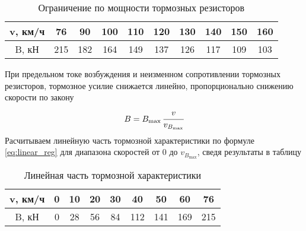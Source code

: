 \begin{table}[H]
 \centering
 \caption{Ограничение по мощности тормозных резисторов}
 \begin{tabular}{|c||c|c|c|c|c|c|c|c|c|}
  \hline
  v, км/ч & 76 & 90 & 100 & 110 & 120 & 130 & 140 & 150 & 160 \\ \hline
  B, кН & 215 & 182 & 164 & 149 & 137 & 126 & 117 & 109 & 103 \\ \hline 
 \end{tabular}
 \label{tab:field_reg}
\end{table}

При предельном токе возбуждения и неизменном сопротивлении тормозных резисторов, тормозное усилие снижается линейно, пропорционально снижению скорости по закону
\begin{equation}
 \label{eq:linear_reg}
 B = B_{\max} \, \cfrac{v}{v_{B_{\max}}}
\end{equation}
Расчитываем линейную часть тормозной характеристики по формуле \eqref{eq:linear_reg} для диапазона скоростей от 0 до $v_{B_{\max}}$, сведя результаты в таблицу 

\begin{table}[H]
 \centering
 \caption{Линейная часть тормозной характеристики}
 \begin{tabular}{|c||c|c|c|c|c|c|c|c|}
  \hline
  v, км/ч & 0 & 10 & 20 & 30 & 40 & 50 & 60 & 76 \\ \hline
  B, кН & 0 & 28 & 56 & 84 & 112 & 141 & 169 & 215 \\ \hline 
 \end{tabular}
 \label{tab:linear_reg}
\end{table}












